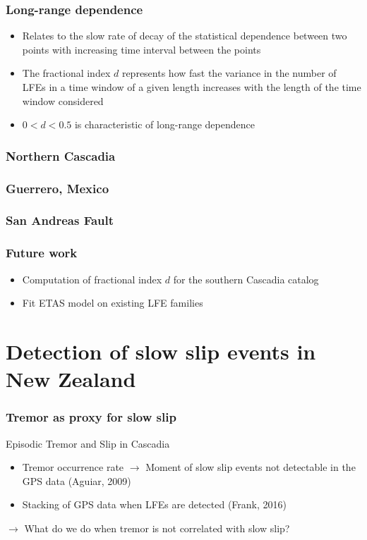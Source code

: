\documentclass{beamer}
\begin{document}
	\begin{frame}
		\frametitle{Long-range dependence}
		\begin{itemize}
			\item Relates to the slow rate of decay of the statistical dependence between two points with increasing time interval between the points
			\item The fractional index $d$ represents how fast the variance in the number of LFEs in a time window of a given length increases with the length of the time window considered
			\item $0 < d < 0.5$ is characteristic of long-range dependence
		\end{itemize}
	\end{frame}

	\begin{frame}
		\frametitle{Northern Cascadia}
	\end{frame}

	\begin{frame}
		\frametitle{Guerrero, Mexico}
	\end{frame}

	\begin{frame}
		\frametitle{San Andreas Fault}
	\end{frame}

	\begin{frame}
		\frametitle{Future work}
		\begin{itemize}
			\item Computation of fractional index $d$ for the southern Cascadia catalog
			\item Fit ETAS model on existing LFE families
		\end{itemize}
	\end{frame}
		

	\section{Detection of slow slip events in New Zealand}

	\begin{frame}
		\frametitle{Tremor as proxy for slow slip}
		Episodic Tremor and Slip in Cascadia
		\begin{itemize}
			\item Tremor occurrence rate $\rightarrow$ Moment of slow slip events not detectable in the GPS data (Aguiar, 2009)
			\item Stacking of GPS data when LFEs are detected (Frank, 2016)
		\end{itemize}
		$\rightarrow$ What do we do when tremor is not correlated with slow slip?
	\end{frame}
		
\end{document}
